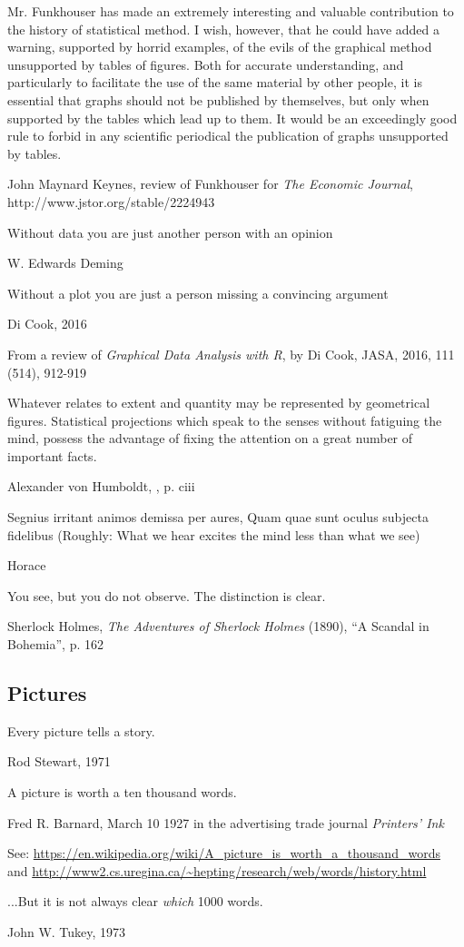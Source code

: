 \epigraph{Mr. Funkhouser has made an extremely interesting and valuable contribution to the history of statistical method. I wish, however, that he could have added a warning, supported by horrid examples, of the evils of the graphical method unsupported by tables of  figures. Both for  accurate understanding, and particularly to facilitate the use of the same material by other people, it is essential that graphs should not be published by themselves, but only when supported by the tables which lead up to them. It would be an exceedingly good rule to forbid in any scientific periodical the publication of graphs unsupported by tables.}{John Maynard Keynes, review of Funkhouser for \emph{The Economic Journal}, http://www.jstor.org/stable/2224943}

\epigraph{Without data you are just another person with an opinion}{W. Edwards Deming}

\epigraph{Without a plot you are just a person missing a convincing argument}{Di Cook, 2016}
From a review of \emph{Graphical Data Analysis with R}, by Di Cook, JASA, 2016, 111 (514), 912-919

\epigraph{Whatever relates to extent and quantity may be represented by geometrical figures. Statistical projections which speak to the senses without fatiguing the mind, possess the advantage of fixing the attention on a great number of important facts.}{Alexander von Humboldt, \citeyear{Humboldt:1811a}, p. ciii}

\epigraph{Segnius irritant animos demissa per aures, Quam quae sunt oculus subjecta fidelibus (Roughly: What we hear excites the mind less than what we see)}{Horace}

\epigraph{You see, but you do not observe. The distinction is clear.}{Sherlock Holmes, \emph{The Adventures of Sherlock Holmes} (1890), ``A Scandal in Bohemia'', p. 162}

\subsection{Pictures}
\epigraph{Every picture tells a story.}{Rod Stewart, 1971}

\epigraph{A picture is worth a ten thousand words.}{Fred R. Barnard, March 10 1927 in the advertising trade journal \emph{Printers' Ink}}
See: \url{https://en.wikipedia.org/wiki/A_picture_is_worth_a_thousand_words} and \url{http://www2.cs.uregina.ca/~hepting/research/web/words/history.html}

\epigraph{...But it is not always clear \emph{which} 1000 words.}{John W. Tukey, 1973}

